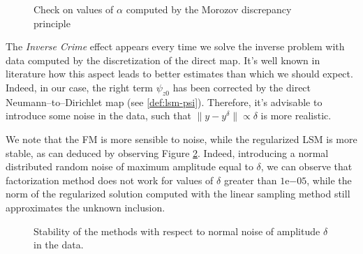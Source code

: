 \begin{center}
\begin{figure}%
\caption{Check on values of $\alpha$ computed by the Morozov discrepancy principle}
\label{fig:discrepancy_alpha}
\end{figure}
\end{center}

The \emph{Inverse Crime} effect appears every time we solve the inverse problem with data computed 
by the discretization of the direct map. It's well known in literature how this aspect leads to 
better estimates than which we should expect. Indeed, in our case, the right term $\psi_{z0}$ 
has been corrected by the direct Neumann--to--Dirichlet map (see \eqref{def:lsm-psi}). Therefore, it's advisable to 
introduce some noise in the data, such that $\|y - y^\delta\|\propto\delta$ is more realistic.

We note that the FM is more sensible to noise, while the regularized LSM is more stable, as can 
deduced by observing Figure \ref{fig:noise}. Indeed, introducing a normal distributed random noise of 
maximum amplitude equal to $\delta$, we can observe that factorization method does not work for 
values of $\delta$ greater than $\mathrm{1e}{-05}$, while the norm of the regularized solution computed with
the linear sampling method still approximates the unknown inclusion.

\begin{center}
\begin{figure}%
\caption{Stability of the methods with respect to normal noise of amplitude $\delta$ in the data.}
\label{fig:noise}
\end{figure}
\end{center}

\clearpage

